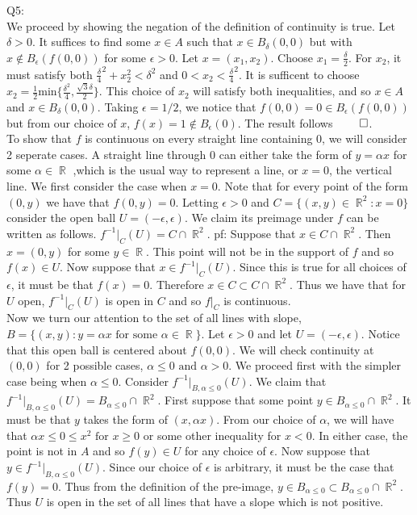 \documentclass[letterpaper]{article}
\DeclareMathOperator{\R}{\mathbb{R}}
\begin{document}
Q5:
\\
We proceed by showing the negation of the definition of continuity is true. Let $\delta >0$. It suffices to find some $x\in A$ such that $x\in B_\delta(0,0)$ but with $x \notin B_\epsilon(f(0,0))$ for some $\epsilon >0$. Let $x=(x_1,x_2)$. Choose $x_1=\frac{\delta}{2}$. For $x_2$, it must satisfy both $\frac{\delta}{4}^2+x_2^2 < \delta^2$ and $0<x_2 < \frac{\delta}{4}^2$. It is sufficent to choose $x_2 = \frac{1}{2} \text{min}\{ \frac{\delta^2}{4} ,\frac{\sqrt{3}\delta}{2} \}$. This choice of $x_2$ will satisfy both inequalities,
and so $x\in A$ and $x\in B_{\delta}(0,0)$. Taking $\epsilon = 1/2$, we notice that $f(0,0)=0 \in B_{\epsilon}(f(0,0))$ but from our choice of $x$, $f(x)=1 \notin B_{\epsilon}(0)$. The result follows $\qed$. 
\\ \newline
To show that $f$ is continuous on every straight line containing $0$, we will consider 2 seperate cases. A straight line through $0$ can either take the form of $y=\alpha x$ for some $\alpha \in \R$ ,which is the usual way to represent a line, or $x=0$, the vertical line. 
We first consider the case when $x=0$. Note that for every point of the form $(0,y)$ we have that $f(0,y)=0$. Letting $\epsilon >0$ and $C = \{ (x,y) \in \R^2 : x=0\} $ consider the open ball $U=(-\epsilon,\epsilon)$. We claim its preimage under $f$ can be written as follows. $f^{-1}|_{C}(U) = C \cap \R^2$. 
\newline pf: 
\newline Suppose that $x\in C\cap \R^2$. Then $x= (0,y)$ for some $y\in \R$. This point will not be in the support of $f$ and so $f(x) \in U$. Now suppose that $x\in f^{-1}|_{C}(U)$. Since this is true for all choices of $\epsilon$, it must be that $f(x)=0$. Therefore $x\in C \subset C \cap \R^2$. Thus we have that for $U$ open, $f^{-1}|_C (U)$ is open in $C$ and so $f|_C$ is continuous.
\\ \newline Now we turn our attention to the set of all lines with slope, $B= \{(x,y): y= \alpha x \text{ for some } \alpha \in \R\}$. Let $\epsilon >0$ and let $U = (-\epsilon, \epsilon)$. Notice that this open ball is centered about $f(0,0)$. We will check continuity at $(0,0)$ for 2 possible cases, $\alpha \leq 0 \text{ and } \alpha >0$. We proceed first with the simpler case being when $\alpha \leq 0$. 
Consider $f^{-1}|_{B,\alpha \leq 0}(U)$. We claim that $f^{-1}|_{B,\alpha \leq 0}(U) = B_{\alpha \leq 0} \cap \R^2$. First suppose that some point $y\in B_{\alpha \leq 0} \cap \R^2$. It must be that $y$ takes the form of $(x,\alpha x)$. From our choice of $\alpha$, we will have that $\alpha x \leq 0 \leq x^2 \text{ for } x \geq 0$ or some other inequality for $x < 0$. In either case, the point is not in $A$ and so $f(y) \in U$ for any choice of $\epsilon$. Now suppose that $y \in f^{-1}|_{B,\alpha \leq 0}(U)$. Since our choice of $\epsilon$ is arbitrary, it must be the case that $f(y) = 0$. Thus from the definition of the pre-image, $y\in B_{\alpha \leq 0} \subset B_{\alpha \leq 0} \cap \R^2$. Thus $U$ is open in the set of all lines that have a slope which is not positive. 
\end{document}
